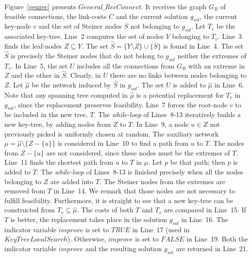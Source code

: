 Figure~\ref{genrec} presents $General\_RecConnect$. 
It receives the graph $G_B$ of feasible connections, the link-costs $C$ 
and the current solution $g_{sol}$, the current key-node $v$ and the set of Steiner nodes 
$\overline{S}$ not belonging to $g_{sol}$. Let $T_v$ be the associated key-tree. Line~2 computes the set of nodes $Y$ belonging to $T_v$. Line~3 finds the leaf-nodes $Z\subseteq Y$. 
The set $\hat{S} = \{Y \setminus Z\} \cup \{ \overline{S}\}$ is found in Line~4. The set 
$\hat{S}$ is precisely the Steiner nodes that do not belong to $g_{sol}$ neither the extremes of $T_v$. In Line~5, the set $U$ includes all the connections from $G_B$ with an extreme 
in $Z$ and the other in $\hat{S}$. Clearly, in $U$ there are no links between nodes 
belonging to $Z$. Let $\hat{\mu}$ be the network induced by $\hat{S}$ in $g_{sol}$. 
The set $U$ is added to $\hat{\mu}$ in Line~6. Note that any spanning tree computed 
in $\hat{\mu}$ is a potential replacement for $T_v$ in $g_{sol}$, since the replacement 
preserves feasibility. Line~7 forces the root-node $v$ to be included in the new tree, $T$. 
The \textit{while-loop} of Lines~8-13 iteratively builds a new key-tree, by adding 
nodes from $Z$ to $T$. In Line~9, a node $u\in Z$ not previously picked 
is uniformly chosen at random. The auxiliary network $\mu = \hat{\mu}\setminus \{Z-\{u\}\}$  
is considered in Line~10 to find a path from $u$ to $T$. The nodes from $Z-\{u\}$ 
are not considered, since these nodes must be the extremes of $T$. Line~11 finds 
the shortest path from $u$ to $T$ in $\mu$. Let $p$ be that path; then $p$ is added to $T$. 
The \textit{while-loop} of Lines~8-13 is finished precisely when all the nodes 
belonging to $Z$ are added into $T$. The Steiner nodes from the extremes are removed from 
$T$ in Line~14. We remark that those nodes are not necessary to fulfill feasibility. 
Furthermore, it is straight to see that a new key-tree can be constructed from $T_v \subseteq \hat{\mu}$. The costs of both $T$ and $T_v$ are compared in Line~15. If $T$ is better, 
the replacement takes place in the solution $g_{sol}$ in Line~16. The indicator 
variable $improve$ is set to $TRUE$ in Line~17 (used in $KeyTreeLocalSearch$). Otherwise, 
$improve$ is set to $FALSE$ in Line~19. Both the indicator variable $improve$ and the 
resulting solution $g_{sol}$ are returned in Line~21. 

